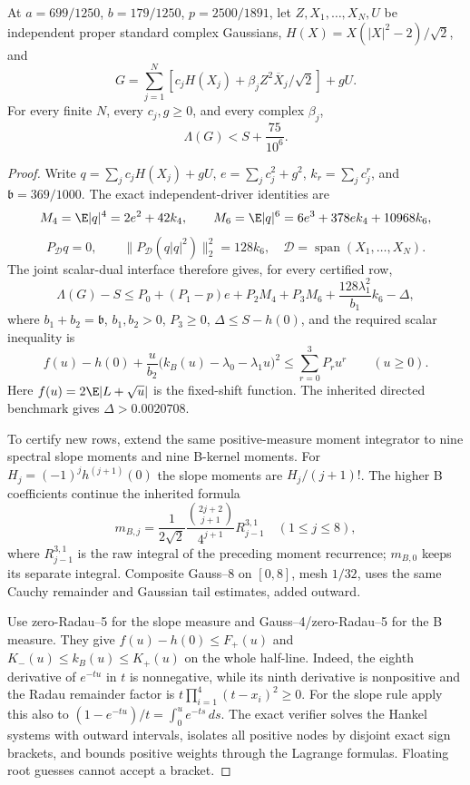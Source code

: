 \begin{theorem}
\label{thm:k-bonly-all}
At $a=699/1250$, $b=179/1250$, $p=2500/1891$, let
$Z,X_1,\ldots,X_N,U$ be independent proper standard complex Gaussians,
$H(X)=X(|X|^2-2)/\sqrt2$, and
\[
 G=\sum_{j=1}^N\left[c_jH(X_j)+\beta_jZ^2\overline X_j/\sqrt2\right]+gU.
\]
For every finite $N$, every $c_j,g\ge0$, and every complex $\beta_j$,
\[
 \boxed{\Lambda(G)<S+\frac{75}{10^6}.}
\]
\end{theorem}

\begin{proof}
Write $q=\sum_jc_jH(X_j)+gU$, $e=\sum_jc_j^2+g^2$,
$k_r=\sum_jc_j^r$, and $\mathfrak b=369/1000$.
The exact independent-driver identities are
\[
 M_4=\E|q|^4=2e^2+42k_4,\qquad
 M_6=\E|q|^6=6e^3+378ek_4+10968k_6,
\]
\[
 P_{\mathcal D}q=0,\qquad
 \|P_{\mathcal D}(q|q|^2)\|_2^2=128k_6,
 \quad\mathcal D=\operatorname{span}(X_1,\ldots,X_N).
\]
The joint scalar-dual interface therefore gives, for every certified row,
\begin{equation}\label{eq:k-bonly-all-row}
 \Lambda(G)-S\le
 P_0+(P_1-p)e+P_2M_4+P_3M_6
 +\frac{128\lambda_1^2}{b_1}k_6-\Delta,
\end{equation}
where $b_1+b_2=\mathfrak b$, $b_1,b_2>0$, $P_3\ge0$,
$\Delta\le S-h(0)$, and the required scalar inequality is
\[
 f(u)-h(0)+\frac{u}{b_2}\bigl(k_B(u)-\lambda_0-\lambda_1u\bigr)^2
 \le\sum_{r=0}^3P_ru^r\qquad(u\ge0).
\]
Here $f(u)=2\E|L+\sqrt u|$ is the fixed-shift function.
The inherited directed benchmark gives $\Delta>0.0020708$.

To certify new rows, extend the same positive-measure moment integrator to
nine spectral slope moments and nine B-kernel moments.
For $H_j=(-1)^jh^{(j+1)}(0)$ the slope moments are $H_j/(j+1)!$.
The higher B coefficients continue the inherited formula
\[
 m_{B,j}=\frac{1}{2\sqrt2}
 \frac{\binom{2j+2}{j+1}}{4^{j+1}}R_{j-1}^{3,1}
 \quad(1\le j\le8),
\]
where $R_{j-1}^{3,1}$ is the raw integral of the preceding moment
recurrence; $m_{B,0}$ keeps its separate integral.
Composite Gauss--8 on $[0,8]$, mesh $1/32$, uses the same Cauchy
remainder and Gaussian tail estimates, added outward.

Use zero-Radau--5 for the slope measure and Gauss--4/zero-Radau--5
for the B measure. They give $f(u)-h(0)\le F_+(u)$ and
$K_-(u)\le k_B(u)\le K_+(u)$ on the whole half-line.
Indeed, the eighth derivative of $e^{-tu}$ in $t$ is nonnegative,
while its ninth derivative is nonpositive and the Radau remainder
factor is $t\prod_{i=1}^4(t-x_i)^2\ge0$.
For the slope rule apply this also to
$(1-e^{-tu})/t=\int_0^u e^{-ts}\,ds$.
The exact verifier solves the Hankel systems with outward intervals,
isolates all positive nodes by disjoint exact sign brackets, and
bounds positive weights through the Lagrange formulas.
Floating root guesses cannot accept a bracket.


\end{proof}
